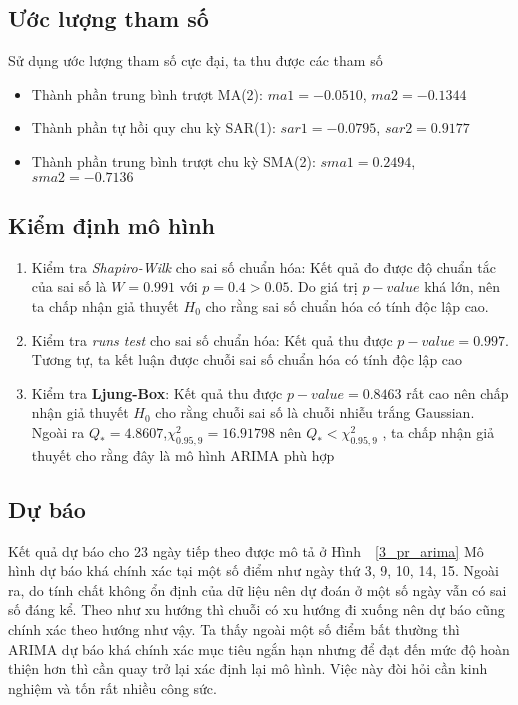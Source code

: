 \subsection{Ước lượng tham số}
Sử dụng ước lượng tham số cực đại, ta thu được các tham số 
\begin{itemize}
	\item Thành phần trung bình trượt MA(2): $ma1 = -0.0510$, $ma2 = -0.1344$
	\item Thành phần tự hồi quy chu kỳ SAR(1): $sar1 = -0.0795$, $sar2 = 0.9177 $
	\item Thành phần trung bình trượt chu kỳ SMA(2): $sma1 = 0.2494$, $sma2 = -0.7136 $
\end{itemize}

\subsection{Kiểm định mô hình}
\begin{enumerate}
\item Kiểm tra \textit{Shapiro-Wilk} cho sai số chuẩn hóa: Kết quả đo được độ chuẩn tắc của sai số là $W=0.991$ với $p=0.4 > 0.05$. Do giá trị $p-value$ khá lớn, nên ta chấp nhận giả thuyết $H_0$ cho rằng sai số chuẩn hóa có tính độc lập cao.
\item Kiểm tra \textit{runs test} cho sai số chuẩn hóa: Kết quả thu được $p-value = 0.997$. Tương tự, ta kết luận được chuỗi sai số chuẩn hóa có tính độc lập cao
\item Kiểm tra \textbf{Ljung-Box}: Kết quả thu được $p-value = 0.8463$ rất cao nên chấp nhận giả thuyết $H_0$ cho rằng chuỗi sai số là chuỗi nhiễu trắng Gaussian. Ngoài ra $Q_{*} = 4.8607$,$ \chi^{2}_{0.95,9} = 16.91798$ nên $Q_{*}<\chi^{2}_{0.95,9}$ , ta chấp nhận giả thuyết cho rằng đây là mô hình ARIMA phù hợp
\end{enumerate}
\subsection{Dự báo}
Kết quả dự báo cho 23 ngày tiếp theo được mô tả ở Hình~~\ref{3_pr_arima}
Mô hình dự báo khá chính xác tại một số điểm như ngày thứ 3, 9, 10, 14, 15. Ngoài ra, do tính chất không ổn định của dữ liệu nên dự đoán ở một số ngày vẫn có sai số đáng kể. Theo như xu hướng thì chuỗi có xu hướng đi xuống nên dự báo cũng chính xác theo hướng như vậy. Ta thấy ngoài một số điểm bất thường thì ARIMA dự báo khá chính xác mục tiêu ngắn hạn nhưng để đạt đến mức độ hoàn thiện hơn thì cần quay trở lại xác định lại mô hình. Việc này đòi hỏi cần kinh nghiệm và tốn rất nhiều công sức.

